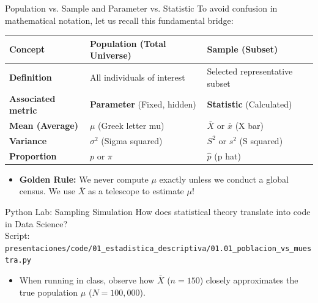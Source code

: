 \documentclass[aspectratio=169,xcolor={dvipsnames,table}]{beamer}
\begin{document}
\begin{frame}{Population vs. Sample and Parameter vs. Statistic}
  To avoid confusion in mathematical notation, let us recall this fundamental bridge:
  
  \vspace{0.4em}
  \begin{center}
    \small
    \begin{tabular}{p{3.2cm} p{4.6cm} p{4.6cm}}
      \toprule
      \textbf{Concept} & \textbf{Population (Total Universe)} & \textbf{Sample (Subset)} \\
      \midrule
      \textbf{Definition} & All individuals of interest & Selected representative subset \\
      \textbf{Associated metric} & \textbf{Parameter} (Fixed, hidden) & \textbf{Statistic} (Calculated) \\
      \textbf{Mean (Average)} & $\mu$ (Greek letter mu) & $\bar{X}$ or $\bar{x}$ (X bar) \\
      \textbf{Variance} & $\sigma^2$ (Sigma squared) & $S^2$ or $s^2$ (S squared) \\
      \textbf{Proportion} & $p$ or $\pi$ & $\hat{p}$ (p hat) \\
      \bottomrule
    \end{tabular}
  \end{center}

  \vspace{0.4em}
  \pause
  \begin{itemize}
    \item \textbf{Golden Rule:} We never compute $\mu$ exactly unless we conduct a global census. We use $\bar{X}$ as a telescope to estimate $\mu$!
  \end{itemize}
\end{frame}

\begin{frame}{Python Lab: Sampling Simulation}
  How does statistical theory translate into code in Data Science? 
  \\ Script: \texttt{\footnotesize presentaciones/code/01\_estadistica\_descriptiva/01.01\_poblacion\_vs\_muestra.py}
  
  \vspace{0.2em}
  {\lstset{basicstyle=\ttfamily\tiny, aboveskip=0.2em, belowskip=0.2em}
  
  }

  \vspace{0.2em}
  \begin{itemize}
    \item When running in class, observe how $\bar{X}$ ($n=150$) closely approximates the true population $\mu$ ($N=100,000$).
  \end{itemize}
\end{frame}
\end{document}
